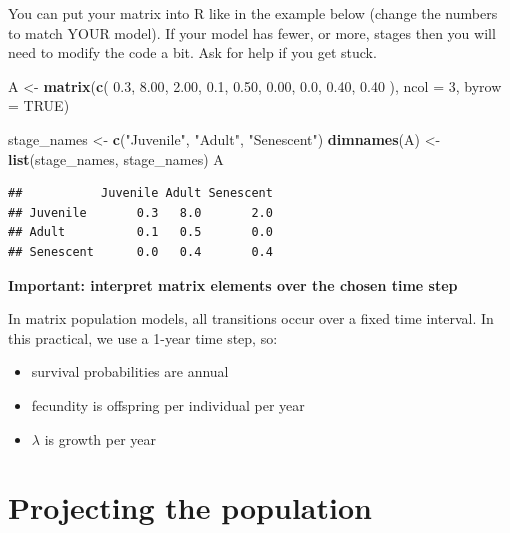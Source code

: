 \documentclass[
  a4paper]{book}
\newenvironment{Shaded}{\begin{snugshade}}{\end{snugshade}}
\newcommand{\AttributeTok}[1]{\textcolor[rgb]{0.13,0.29,0.53}{#1}}
\newcommand{\ConstantTok}[1]{\textcolor[rgb]{0.56,0.35,0.01}{#1}}
\newcommand{\DecValTok}[1]{\textcolor[rgb]{0.00,0.00,0.81}{#1}}
\newcommand{\FloatTok}[1]{\textcolor[rgb]{0.00,0.00,0.81}{#1}}
\newcommand{\FunctionTok}[1]{\textcolor[rgb]{0.13,0.29,0.53}{\textbf{#1}}}
\newcommand{\NormalTok}[1]{#1}
\newcommand{\OtherTok}[1]{\textcolor[rgb]{0.56,0.35,0.01}{#1}}
\newcommand{\StringTok}[1]{\textcolor[rgb]{0.31,0.60,0.02}{#1}}
\providecommand{\tightlist}{%
  \setlength{\itemsep}{0pt}\setlength{\parskip}{0pt}}
\begin{document}
You can put your matrix into R like in the example below (change the numbers to match YOUR model). If your model has fewer, or more, stages then you will need to modify the code a bit. Ask for help if you get stuck.

\begin{Shaded}
\begin{Highlighting}[]
\NormalTok{A }\OtherTok{\textless{}{-}} \FunctionTok{matrix}\NormalTok{(}\FunctionTok{c}\NormalTok{(}
  \FloatTok{0.3}\NormalTok{, }\FloatTok{8.00}\NormalTok{, }\FloatTok{2.00}\NormalTok{,}
  \FloatTok{0.1}\NormalTok{, }\FloatTok{0.50}\NormalTok{, }\FloatTok{0.00}\NormalTok{,}
  \FloatTok{0.0}\NormalTok{, }\FloatTok{0.40}\NormalTok{, }\FloatTok{0.40}
\NormalTok{), }\AttributeTok{ncol =} \DecValTok{3}\NormalTok{, }\AttributeTok{byrow =} \ConstantTok{TRUE}\NormalTok{)}

\NormalTok{stage\_names }\OtherTok{\textless{}{-}} \FunctionTok{c}\NormalTok{(}\StringTok{"Juvenile"}\NormalTok{, }\StringTok{"Adult"}\NormalTok{, }\StringTok{"Senescent"}\NormalTok{)}
\FunctionTok{dimnames}\NormalTok{(A) }\OtherTok{\textless{}{-}} \FunctionTok{list}\NormalTok{(stage\_names, stage\_names)}
\NormalTok{A}
\end{Highlighting}
\end{Shaded}

\begin{verbatim}
##           Juvenile Adult Senescent
## Juvenile       0.3   8.0       2.0
## Adult          0.1   0.5       0.0
## Senescent      0.0   0.4       0.4
\end{verbatim}

\textbf{Important: interpret matrix elements over the chosen time step}

In matrix population models, all transitions occur over a fixed time interval. In this practical, we use a 1-year time step, so:

\begin{itemize}
\tightlist
\item
  survival probabilities are annual
\item
  fecundity is offspring per individual per year
\item
  \(\lambda\) is growth per year
\end{itemize}

\section{Projecting the population}\label{projecting-the-population}
\end{document}
